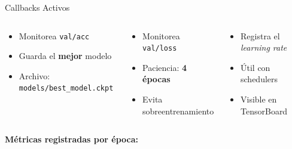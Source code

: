 \documentclass[aspectratio=169,10pt]{beamer}
\newcommand{\faIcon}[1]{\textbullet}
\newcommand{\codefile}[1]{\texttt{\textcolor{pyblue}{#1}}}
\begin{document}
\begin{frame}{Callbacks Activos}

    \begin{columns}
        \begin{tcolorbox}[colback=darkgreen!10, colframe=darkgreen!70,
                          title={\scriptsize\faIcon{save}\ ModelCheckpoint}]
            \scriptsize
            \begin{itemize}
                \item Monitorea \texttt{val/acc}
                \item Guarda el \textbf{mejor} modelo
                \item Archivo: \codefile{models/best\_model.ckpt}
            \end{itemize}
        \end{tcolorbox}

        \begin{tcolorbox}[colback=red!10, colframe=red!70,
                          title={\scriptsize\faIcon{stop-circle}\ EarlyStopping}]
            \scriptsize
            \begin{itemize}
                \item Monitorea \texttt{val/loss}
                \item Paciencia: \textbf{4 épocas}
                \item Evita sobreentrenamiento
            \end{itemize}
        \end{tcolorbox}

        \begin{tcolorbox}[colback=pyblue!10, colframe=pyblue!70,
                          title={\scriptsize\faIcon{chart-bar}\ LRMonitor}]
            \scriptsize
            \begin{itemize}
                \item Registra el \textit{learning rate}
                \item Útil con schedulers
                \item Visible en TensorBoard
            \end{itemize}
        \end{tcolorbox}
    \end{columns}

    \vspace{10pt}
    \textbf{Métricas registradas por época:}


\end{frame}
\end{document}

